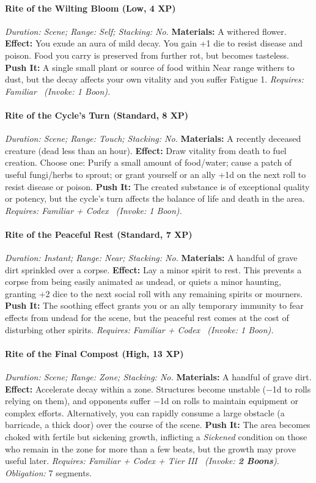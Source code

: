 \documentclass[12pt,twoside]{book}
\begin{document}
\paragraph{Rite of the Wilting Bloom (Low, 4 XP)} \emph{Duration: Scene; Range: Self; Stacking: No.}
\textbf{Materials:} A withered flower.
\textbf{Effect:} You exude an aura of mild decay. You gain +1 die to resist disease and poison. Food you carry is preserved from further rot, but becomes tasteless.
\textbf{Push It:} A single small plant or source of food within Near range withers to dust, but the decay affects your own vitality and you suffer Fatigue 1.
\emph{Requires: Familiar \ (\textit{Invoke:} 1 Boon).}
\paragraph{Rite of the Cycle's Turn (Standard, 8 XP)} \emph{Duration: Scene; Range: Touch; Stacking: No.}
\textbf{Materials:} A recently deceased creature (dead less than an hour).
\textbf{Effect:} Draw vitality from death to fuel creation. Choose one: Purify a small amount of food/water; cause a patch of useful fungi/herbs to sprout; or grant yourself or an ally +1d on the next roll to resist disease or poison.
\textbf{Push It:} The created substance is of exceptional quality or potency, but the cycle's turn affects the balance of life and death in the area.
\emph{Requires: Familiar + Codex \ (\textit{Invoke:} 1 Boon).}
\paragraph{Rite of the Peaceful Rest (Standard, 7 XP)} \emph{Duration: Instant; Range: Near; Stacking: No.}
\textbf{Materials:} A handful of grave dirt sprinkled over a corpse.
\textbf{Effect:} Lay a minor spirit to rest. This prevents a corpse from being easily animated as undead, or quiets a minor haunting, granting +2 dice to the next social roll with any remaining spirits or mourners.
\textbf{Push It:} The soothing effect grants you or an ally temporary immunity to fear effects from undead for the scene, but the peaceful rest comes at the cost of disturbing other spirits.
\emph{Requires: Familiar + Codex \ (\textit{Invoke:} 1 Boon).}
\paragraph{Rite of the Final Compost (High, 13 XP)} \emph{Duration: Scene; Range: Zone; Stacking: No.}
\textbf{Materials:} A handful of grave dirt.
\textbf{Effect:} Accelerate decay within a zone. Structures become unstable (−1d to rolls relying on them), and opponents suffer −1d on rolls to maintain equipment or complex efforts. Alternatively, you can rapidly consume a large obstacle (a barricade, a thick door) over the course of the scene.
\textbf{Push It:} The area becomes choked with fertile but sickening growth, inflicting a \emph{Sickened} condition on those who remain in the zone for more than a few beats, but the growth may prove useful later.
\emph{Requires: Familiar + Codex + Tier III \ (\textit{Invoke:} \textbf{2 Boons}).}
\emph{Obligation:} 7 segments.
\end{document}
